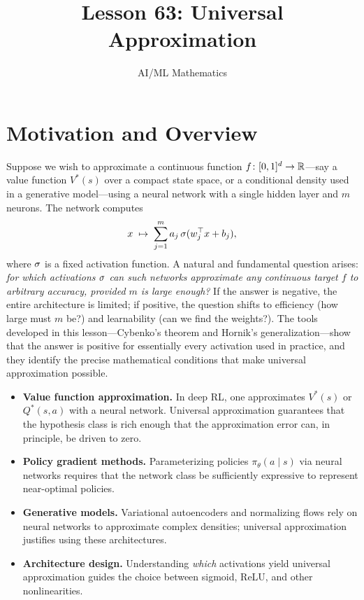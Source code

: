 \documentclass[11pt,a4paper]{article}
\title{Lesson 63: Universal Approximation}
\author{AI/ML Mathematics}
\date{}
\begin{document}
\maketitle
\tableofcontents
\newpage

\section{Motivation and Overview}
\label{sec:motivation}

Suppose we wish to approximate a continuous function
$f \colon [0,1]^d \to \mathbb{R}$---say a value function $V^*(s)$ over a compact
state space, or a conditional density used in a generative model---using a
neural network with a single hidden layer and $m$ neurons.  The network
computes
\[
  x \;\mapsto\; \sum_{j=1}^{m} a_j \, \sigma(w_j^\top x + b_j),
\]
where $\sigma$ is a fixed activation function.  A natural and fundamental
question arises: \emph{for which activations $\sigma$ can such networks
approximate any continuous target $f$ to arbitrary accuracy, provided $m$ is
large enough?}  If the answer is negative, the entire architecture is
limited; if positive, the question shifts to efficiency (how large must $m$
be?) and learnability (can we find the weights?).  The tools developed in
this lesson---Cybenko's theorem and Hornik's generalization---show that the
answer is positive for essentially every activation used in practice, and
they identify the precise mathematical conditions that make universal
approximation possible.

\begin{rlconnection}[title={Why Universal Approximation Matters for RL/ML}]
\begin{itemize}[nosep]
  \item \textbf{Value function approximation.}  In deep RL, one
    approximates $V^*(s)$ or $Q^*(s,a)$ with a neural network.  Universal
    approximation guarantees that the hypothesis class is rich enough that
    the approximation error can, in principle, be driven to zero.
  \item \textbf{Policy gradient methods.}  Parameterizing policies
    $\pi_\theta(a \mid s)$ via neural networks requires that the network
    class be sufficiently expressive to represent near-optimal policies.
  \item \textbf{Generative models.}  Variational autoencoders and
    normalizing flows rely on neural networks to approximate complex
    densities; universal approximation justifies using these architectures.
  \item \textbf{Architecture design.}  Understanding \emph{which}
    activations yield universal approximation guides the choice between
    sigmoid, ReLU, and other nonlinearities.
\end{itemize}
\end{rlconnection}
\end{document}
